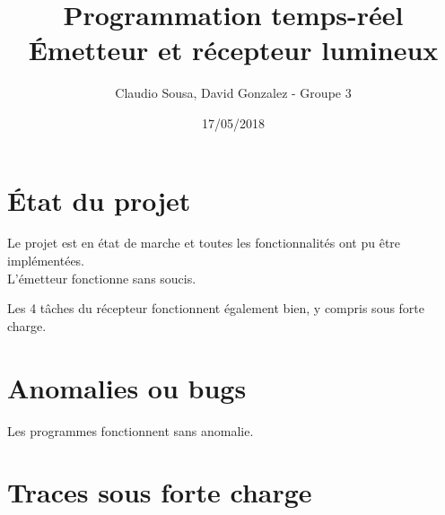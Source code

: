 \documentclass[11pt, a4paper]{article}
\begin{document}
\title
{
    \Huge{Programmation temps-réel} \\
    \Huge{Émetteur et récepteur lumineux}
}
\author
{
    \LARGE{Claudio Sousa, David Gonzalez - Groupe 3}
}
\date{17/05/2018}
\maketitle

\thispagestyle{empty}


\newpage

\section{État du projet}

Le projet est en état de marche et
toutes les fonctionnalités ont pu être implémentées. \\

L'émetteur fonctionne sans soucis.

Les 4 tâches du récepteur fonctionnent également bien, y compris sous forte charge.

\section{Anomalies ou bugs}

Les programmes fonctionnent sans anomalie.

\section{Traces sous forte charge}
\end{document}

